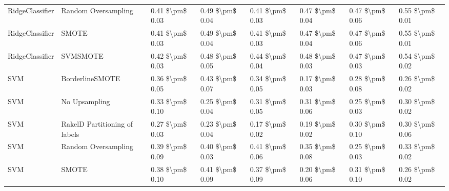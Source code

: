\begin{tabular}{llllllll}
                RidgeClassifier &           Random Oversampling & 0.41 \$\textbackslash pm\$ 0.03 &           0.49 \$\textbackslash pm\$ 0.04 &       0.41 \$\textbackslash pm\$ 0.03 &        0.47 \$\textbackslash pm\$ 0.04 &                         0.47 \$\textbackslash pm\$ 0.06 &     0.55 \$\textbackslash pm\$ 0.01 \\
                RidgeClassifier &                         SMOTE & 0.41 \$\textbackslash pm\$ 0.03 &           0.49 \$\textbackslash pm\$ 0.04 &       0.41 \$\textbackslash pm\$ 0.03 &        0.47 \$\textbackslash pm\$ 0.04 &                         0.47 \$\textbackslash pm\$ 0.06 &     0.55 \$\textbackslash pm\$ 0.01 \\
                RidgeClassifier &                      SVMSMOTE & 0.42 \$\textbackslash pm\$ 0.03 &           0.48 \$\textbackslash pm\$ 0.05 &       0.44 \$\textbackslash pm\$ 0.04 &        0.48 \$\textbackslash pm\$ 0.03 &                         0.47 \$\textbackslash pm\$ 0.03 &     0.54 \$\textbackslash pm\$ 0.02 \\
                            SVM &               BorderlineSMOTE & 0.36 \$\textbackslash pm\$ 0.05 &           0.43 \$\textbackslash pm\$ 0.07 &       0.34 \$\textbackslash pm\$ 0.05 &        0.17 \$\textbackslash pm\$ 0.03 &                         0.28 \$\textbackslash pm\$ 0.08 &     0.26 \$\textbackslash pm\$ 0.02 \\
                            SVM &                 No Upsampling & 0.33 \$\textbackslash pm\$ 0.10 &           0.25 \$\textbackslash pm\$ 0.04 &       0.31 \$\textbackslash pm\$ 0.05 &        0.31 \$\textbackslash pm\$ 0.06 &                         0.25 \$\textbackslash pm\$ 0.03 &     0.30 \$\textbackslash pm\$ 0.02 \\
                            SVM & RakelD Partitioning of labels & 0.27 \$\textbackslash pm\$ 0.03 &           0.23 \$\textbackslash pm\$ 0.04 &       0.17 \$\textbackslash pm\$ 0.02 &        0.19 \$\textbackslash pm\$ 0.02 &                         0.30 \$\textbackslash pm\$ 0.10 &     0.30 \$\textbackslash pm\$ 0.06 \\
                            SVM &           Random Oversampling & 0.39 \$\textbackslash pm\$ 0.09 &           0.40 \$\textbackslash pm\$ 0.03 &       0.41 \$\textbackslash pm\$ 0.06 &        0.35 \$\textbackslash pm\$ 0.08 &                         0.25 \$\textbackslash pm\$ 0.03 &     0.33 \$\textbackslash pm\$ 0.02 \\
                            SVM &                         SMOTE & 0.38 \$\textbackslash pm\$ 0.10 &           0.41 \$\textbackslash pm\$ 0.09 &       0.37 \$\textbackslash pm\$ 0.09 &        0.20 \$\textbackslash pm\$ 0.06 &                         0.31 \$\textbackslash pm\$ 0.10 &     0.26 \$\textbackslash pm\$ 0.02 \\

\end{tabular}
